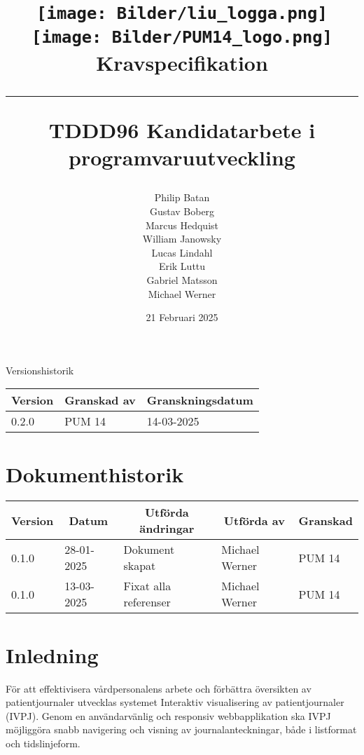 \documentclass{article}
\title{
\texttt{[image: Bilder/liu\_logga.png]} \\
\vspace{3cm} \texttt{[image: Bilder/PUM14\_logo.png]} \\
\vspace{2.0cm} \textbf{Kravspecifikation} \\
 \endgraf\rule{\textwidth}{.4pt}
  \large \textbf{TDDD96 Kandidatarbete i programvaruutveckling}\\
   }
\author{
    \parbox{\textwidth}{%
    \begin{center}
        Philip Batan \\
        Gustav Boberg \\
        Marcus Hedquist \\
        William Janowsky \\
        Lucas Lindahl \\
        Erik Luttu \\
        Gabriel Matsson \\
        Michael Werner 
    \end{center}
    }
}
\date{21 Februari 2025}
\begin{document}
\maketitle

\vfill %

\begin{center}
Versionshistorik
\end{center}

\begin{table}[H]
\centering
\begin{tabular}{|p{}|p{}|p{}|}
    \hline
    \textbf{Version} & \textbf{Granskad av} & \textbf{Granskningsdatum} \\
    \hline
    0.2.0 & PUM 14 & 14-03-2025 \\
    \hline
\end{tabular}
\end{table}

\newpage
\tableofcontents
\newpage

\section*{Dokumenthistorik}
\begin{tabular}{p{}|p{}|p{}|p{}|p{}} 
  \multicolumn{1}{c}{\bfseries Version} & 
  \multicolumn{1}{|c}{\bfseries Datum} & 
  \multicolumn{1}{|c}{\bfseries Utförda ändringar} & 
  \multicolumn{1}{|c}{\bfseries Utförda av} & 
  \multicolumn{1}{|c}{\bfseries Granskad}\\
  \hline
  \hline
  0.1.0 & 28-01-2025 & Dokument skapat & Michael Werner & PUM 14 \\
  \hline
 0.1.0 & 13-03-2025 & Fixat alla referenser & Michael Werner & PUM 14 \\
  \hline
\end{tabular}
\newpage

\section{Inledning}
För att effektivisera vårdpersonalens arbete och förbättra översikten av patientjournaler utvecklas systemet Interaktiv visualisering av patientjournaler (IVPJ). Genom en användarvänlig och responsiv webbapplikation ska IVPJ möjliggöra snabb navigering och visning av journalanteckningar, både i listformat och tidslinjeform.
\end{document}
